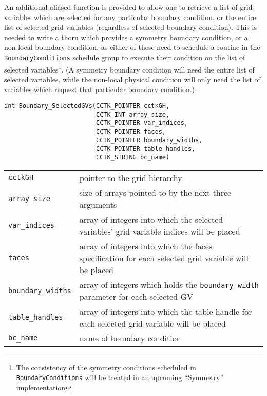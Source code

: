\documentclass{article}
\begin{document}
An additional aliased function is provided to allow one to retrieve a
list of grid variables which are selected for any particular boundary
condition, or the entire list of selected grid variables (regardless of
selected boundary condition).  This is needed to write a thorn which
provides a symmetry boundary condition, or a non-local boundary
condition, as either of these need to schedule a routine in the
\texttt{BoundaryConditions} schedule group to execute their condition
on the list of selected variables\footnote{The consistency of the
symmetry conditions scheduled in \texttt{BoundaryConditions} will be
treated in an upcoming ``Symmetry'' implementation}.  (A symmetry
boundary condition will need the entire list of selected variables,
while the non-local physical condition will only need the list of
variables which request that particular boundary condition.)

\begin{verbatim}
int Boundary_SelectedGVs(CCTK_POINTER cctkGH, 
                         CCTK_INT array_size,
                         CCTK_POINTER var_indices,
                         CCTK_POINTER faces,
                         CCTK_POINTER boundary_widths,
                         CCTK_POINTER table_handles,
                         CCTK_STRING bc_name)
\end{verbatim}
\begin{tabular}{ll}
\texttt{cctkGH} & pointer to the grid hierarchy\\
\texttt{array\_size} & size of arrays pointed to by the next three arguments\\
\texttt{var\_indices} & array of integers into which the selected variables' grid variable indices will be placed\\
\texttt{faces} & array of integers into which the faces specification for each selected grid variable will be placed\\
\texttt{boundary\_widths} & array of integers which holds the \texttt{boundary\_width} parameter for each selected GV\\
\texttt{table\_handles} & array of integers into which the table handle for each selected grid variable will be placed\\
\texttt{bc\_name} & name of boundary condition
\end{tabular}
\end{document}
